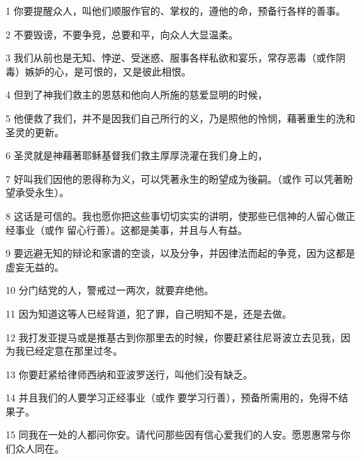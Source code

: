 \par 1 你要提醒众人，叫他们顺服作官的、掌权的，遵他的命，预备行各样的善事。
\par 2 不要毁谤，不要争竞，总要和平，向众人大显温柔。
\par 3 我们从前也是无知、悖逆、受迷惑、服事各样私欲和宴乐，常存恶毒（或作阴毒）嫉妒的心，是可恨的，又是彼此相恨。
\par 4 但到了神我们救主的恩慈和他向人所施的慈爱显明的时候，
\par 5 他便救了我们，并不是因我们自己所行的义，乃是照他的怜悯，藉著重生的洗和圣灵的更新。
\par 6 圣灵就是神藉著耶稣基督我们救主厚厚浇灌在我们身上的，
\par 7 好叫我们因他的恩得称为义，可以凭著永生的盼望成为後嗣。（或作可以凭著盼望承受永生）。
\par 8 这话是可信的。我也愿你把这些事切切实实的讲明，使那些已信神的人留心做正经事业（或作留心行善）。这都是美事，并且与人有益。
\par 9 要远避无知的辩论和家谱的空谈，以及分争，并因律法而起的争竞，因为这都是虚妄无益的。
\par 10 分门结党的人，警戒过一两次，就要弃绝他。
\par 11 因为知道这等人已经背道，犯了罪，自己明知不是，还是去做。
\par 12 我打发亚提马或是推基古到你那里去的时候，你要赶紧往尼哥波立去见我，因为我已经定意在那里过冬。
\par 13 你要赶紧给律师西纳和亚波罗送行，叫他们没有缺乏。
\par 14 并且我们的人要学习正经事业（或作要学习行善），预备所需用的，免得不结果子。
\par 15 同我在一处的人都问你安。请代问那些因有信心爱我们的人安。愿恩惠常与你们众人同在。


